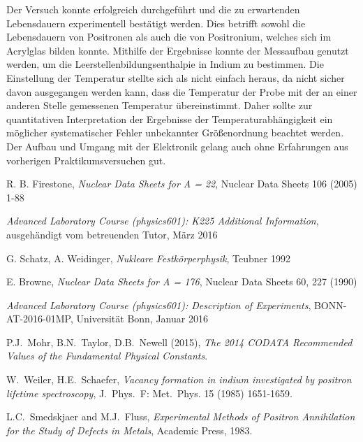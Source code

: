 \documentclass[11pt, a4paper]{article}
\numberwithin{equation}{section}
\begin{document}
Der Versuch konnte erfolgreich durchgeführt und die zu erwartenden Lebensdauern experimentell bestätigt werden.
Dies betrifft sowohl die Lebensdauern von Positronen als auch die von Positronium, welches sich im Acrylglas bilden konnte.
Mithilfe der Ergebnisse konnte der Messaufbau genutzt werden, um die Leerstellenbildungsenthalpie in Indium zu bestimmen.
Die Einstellung der Temperatur stellte sich als nicht einfach heraus, da nicht sicher davon ausgegangen werden kann, dass die Temperatur der Probe mit der an einer anderen Stelle gemessenen Temperatur übereinstimmt.
Daher sollte zur quantitativen Interpretation der Ergebnisse der Temperaturabhängigkeit ein möglicher systematischer Fehler unbekannter Größenordnung beachtet werden.
Der Aufbau und Umgang mit der Elektronik gelang auch ohne Erfahrungen aus vorherigen Praktikumsversuchen gut.

\FloatBarrier
\vspace{\fill}
\begin{thebibliography}{19}
	R. B. Firestone, \emph{Nuclear Data Sheets for A = 22}, Nuclear Data Sheets 106 (2005) 1-88
	
	\emph{Advanced Laboratory Course (physics601): K225 Additional Information}, ausgehändigt vom betreuenden Tutor, März 2016
	
	G. Schatz, A. Weidinger, \emph{Nukleare Festkörperphysik}, Teubner 1992
	
	E. Browne, \emph{Nuclear Data Sheets for A = 176}, Nuclear Data Sheets 60, 227 (1990)
	
	\emph{Advanced Laboratory Course (physics601): Description of Experiments}, BONN-AT-2016-01MP, Universität Bonn, Januar 2016

	P.J.\ Mohr, B.N.\ Taylor, D.B.\ Newell (2015),
	\emph{The 2014 CODATA Recommended Values of the Fundamental Physical Constants}.

	W.\ Weiler, H.E.\ Schaefer,
	\emph{Vacancy formation in indium investigated by positron lifetime spectroscopy},
	J.\ Phys.\ F: Met.\ Phys. 15 (1985) 1651-1659.

	L.C.\ Smedskjaer and M.J.\ Fluss,
	\emph{Experimental Methods of Positron Annihilation for the Study of Defects in Metals},
	Academic Press, 1983.
	
\end{thebibliography}
\end{document}
